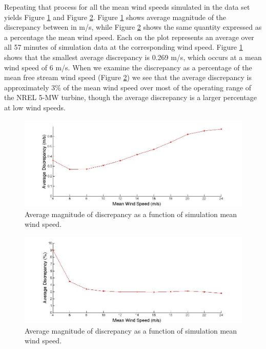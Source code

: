 Repeating that process for all the mean wind speeds simulated in the data set yields Figure \ref{fig2-11} and Figure \ref{fig2-12}. Figure \ref{fig2-11} shows average magnitude of the discrepancy between in m/s, while Figure \ref{fig2-12} shows the same quantity expressed as a percentage the mean wind speed. Each \* on the plot represents an average over all 57 minutes of simulation data at the corresponding wind speed. Figure \ref{fig2-11} shows that the smallest average discrepancy is 0.269 m/s, which occurs at a mean wind speed of  6 m/s. When we examine the discrepancy as a percentage of the mean free stream wind speed  (Figure \ref{fig2-12}) we see that the average discrepancy is approximately 3\% of the mean wind speed over most of the operating range of the NREL 5-MW turbine, though the  average discrepancy is a larger percentage at low wind speeds.

\begin{figure}[htbp]
	\centering
		\includegraphics[width = \linewidth]{Figures/ch2Figures/fig2-11.jpg}
		
	\caption{Average magnitude of discrepancy as a function of simulation mean wind speed.}
	\label{fig2-11}
\end{figure}

\begin{figure}[htbp]
	\centering
		\includegraphics[width = \linewidth]{Figures/ch2Figures/fig2-12.jpg}
		
	\caption{Average magnitude of discrepancy as a function of simulation mean wind speed.}
	\label{fig2-12}
\end{figure}



